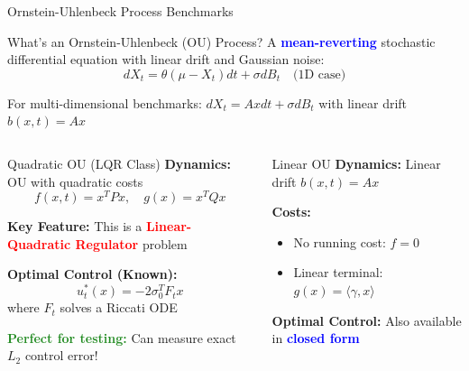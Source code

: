 \documentclass[aspectratio=169,xcolor=dvipsnames]{beamer}
\begin{document}
\begin{frame}[allowframebreaks]{Ornstein-Uhlenbeck Process Benchmarks}
    \vspace{-0.3cm}
    
    \begin{block}{What's an Ornstein-Uhlenbeck (OU) Process?}
        A \textcolor{blue}{\textbf{mean-reverting}} stochastic differential equation with linear drift and Gaussian noise:
        $$dX_t = \theta(\mu - X_t) dt + \sigma dB_t \quad \text{(1D case)}$$
        
        For multi-dimensional benchmarks: $dX_t = Ax dt + \sigma dB_t$ with linear drift $b(x,t) = Ax$
    \end{block}
    
    \vspace{0.5cm}
    
    \begin{columns}[t]
        \begin{alertblock}{Quadratic OU (LQR Class)}
            \small
            \textbf{Dynamics:} OU with quadratic costs
            $$f(x,t) = x^T P x, \quad g(x) = x^T Q x$$
            
            \textbf{Key Feature:} This is a \textcolor{red}{\textbf{Linear-Quadratic Regulator}} problem
            
            \textbf{Optimal Control (Known):}
            $$u_t^*(x) = -2\sigma_0^T F_t x$$
            where $F_t$ solves a Riccati ODE
            
            \textcolor{ForestGreen}{\textbf{Perfect for testing:}} Can measure exact $L_2$ control error!
        \end{alertblock}
        
        \begin{block}{Linear OU}
            \small
            \textbf{Dynamics:} Linear drift $b(x,t) = Ax$
            
            \textbf{Costs:} 
            \begin{itemize}
                \item No running cost: $f = 0$
                \item Linear terminal: $g(x) = \langle\gamma, x\rangle$
            \end{itemize}
            
            \textbf{Optimal Control:} Also available in \textcolor{blue}{\textbf{closed form}}
            

\end{block}
\end{columns}
\end{frame}
\end{document}
